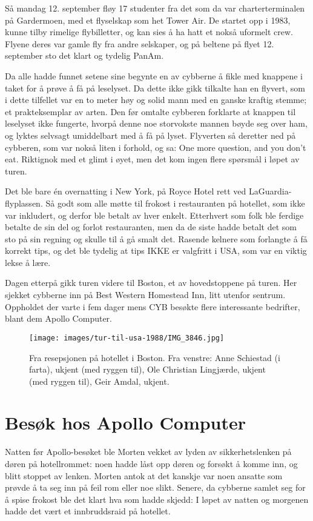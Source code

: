 Så mandag 12. september fløy 17 studenter fra det som da var charterterminalen på Gardermoen, med et flyselskap som het Tower Air. De startet opp i 1983, kunne tilby rimelige flybilletter, og kan sies å ha hatt et nokså uformelt crew. Flyene deres var gamle fly fra andre selskaper, og på beltene på flyet 12. september sto det klart og tydelig PanAm.

Da alle hadde funnet setene sine begynte en av cybberne å fikle med knappene i taket for å prøve å få på leselyset. Da dette ikke gikk tilkalte han en flyvert, som i dette tilfellet var en to meter høy og solid mann med en ganske kraftig stemme; et prakteksemplar av arten. Den før omtalte cybberen forklarte at knappen til leselyset ikke fungerte, hvorpå denne noe storvokste mannen bøyde seg over ham, og lyktes selvsagt umiddelbart med å få på lyset. Flyverten så deretter ned på cybberen, som var nokså liten i forhold, og sa: One more question, and you don't eat. Riktignok med et glimt i øyet, men det kom ingen flere spørsmål i løpet av turen.

Det ble bare én overnatting i New York, på Royce Hotel rett ved LaGuardia-flyplassen. Så godt som alle møtte til frokost i restauranten på hotellet, som ikke var inkludert, og derfor ble betalt av hver enkelt. Etterhvert som folk ble ferdige betalte de sin del og forlot restauranten, men da de siste hadde betalt det som sto på sin regning og skulle til å gå smalt det. Rasende kelnere som forlangte å få korrekt tips, og det ble tydelig at tips IKKE er valgfritt i USA, som var en viktig lekse å lære.

Dagen etterpå gikk turen videre til Boston, et av hovedstoppene på turen. Her sjekket cybberne inn på Best Western Homestead Inn, litt utenfor sentrum. Oppholdet der varte i fem dager mens CYB besøkte flere interessante bedrifter, blant dem Apollo Computer.

\begin{figure}
	\texttt{[image: images/tur-til-usa-1988/IMG\_3846.jpg]}
	\caption{Fra resepsjonen på hotellet i Boston. Fra venstre: Anne Schiestad (i farta), ukjent (med ryggen til), Ole Christian Lingjærde, ukjent (med ryggen til), Geir Amdal, ukjent.}
\end{figure}

\section{Besøk hos Apollo Computer}

Natten før Apollo-besøket ble Morten vekket av lyden av sikkerhetslenken på døren på hotellrommet: noen hadde låst opp døren og forsøkt å komme inn, og blitt stoppet av lenken. Morten antok at det kanskje var noen ansatte som prøvde å ta seg inn på feil rom eller noe slikt. Senere, da cybberne samlet seg for å spise frokost ble det klart hva som hadde skjedd: I løpet av natten og morgenen hadde det vært et innbruddsraid på hotellet.

